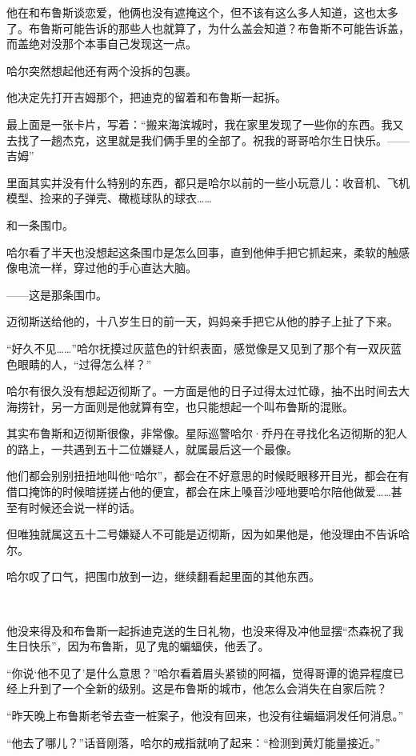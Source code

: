 \documentclass[../main]{subfiles}
\begin{document}
他在和布鲁斯谈恋爱，他俩也没有遮掩这个，但不该有这么多人知道，这也太多了。布鲁斯可能告诉的那些人也就算了，为什么盖会知道？布鲁斯不可能告诉盖，而盖绝对没那个本事自己发现这一点。

哈尔突然想起他还有两个没拆的包裹。

他决定先打开吉姆那个，把迪克的留着和布鲁斯一起拆。

最上面是一张卡片，写着：“搬来海滨城时，我在家里发现了一些你的东西。我又去找了一趟杰克，这里就是我们俩手里的全部了。祝我的哥哥哈尔生日快乐。——吉姆”

里面其实并没有什么特别的东西，都只是哈尔以前的一些小玩意儿：收音机、飞机模型、捡来的子弹壳、橄榄球队的球衣……

和一条围巾。

哈尔看了半天也没想起这条围巾是怎么回事，直到他伸手把它抓起来，柔软的触感像电流一样，穿过他的手心直达大脑。

——这是那条围巾。

迈彻斯送给他的，十八岁生日的前一天，妈妈亲手把它从他的脖子上扯了下来。

“好久不见……”哈尔抚摸过灰蓝色的针织表面，感觉像是又见到了那个有一双灰蓝色眼睛的人，“过得怎么样？”

哈尔有很久没有想起迈彻斯了。一方面是他的日子过得太过忙碌，抽不出时间去大海捞针，另一方面则是他就算有空，也只能想起一个叫布鲁斯的混账。

其实布鲁斯和迈彻斯很像，非常像。星际巡警哈尔·乔丹在寻找化名迈彻斯的犯人的路上，一共遇到五十二位嫌疑人，就属最后这一个最像。

他们都会别别扭扭地叫他“哈尔”，都会在不好意思的时候眨眼移开目光，都会在有借口掩饰的时候暗搓搓占他的便宜，都会在床上嗓音沙哑地要哈尔陪他做爱……甚至有时候还会说一样的话。

但唯独就属这五十二号嫌疑人不可能是迈彻斯，因为如果他是，他没理由不告诉哈尔。

哈尔叹了口气，把围巾放到一边，继续翻看起里面的其他东西。

~\

他没来得及和布鲁斯一起拆迪克送的生日礼物，也没来得及冲他显摆“杰森祝了我生日快乐”，因为布鲁斯，见了鬼的蝙蝠侠，他丢了。

“你说‘他不见了’是什么意思？”哈尔看着眉头紧锁的阿福，觉得哥谭的诡异程度已经上升到了一个全新的级别。这是布鲁斯的城市，他怎么会消失在自家后院？

“昨天晚上布鲁斯老爷去查一桩案子，他没有回来，也没有往蝙蝠洞发任何消息。”

“他去了哪儿？”话音刚落，哈尔的戒指就响了起来：“检测到黄灯能量接近。”
\end{document}
